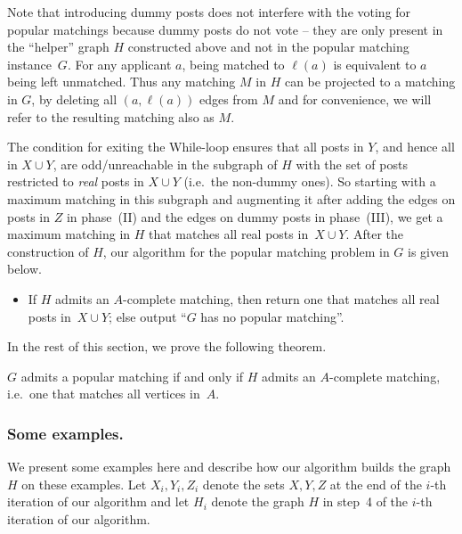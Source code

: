 \documentclass[11pt]{llncs}
\begin{document}
Note that
introducing dummy posts does not interfere with the voting for popular matchings because 
dummy posts do not vote -- they are only present in the 
``helper'' graph $H$ constructed above and not in the popular matching instance~$G$. For any
applicant $a$, being matched to $\ell(a)$ is equivalent to $a$ being left unmatched. Thus any 
matching $M$ in $H$ can be projected to a matching in $G$, by deleting all $(a,\ell(a))$ 
edges from $M$ and for convenience, we will refer to the resulting matching also as $M$.


The condition for exiting the While-loop ensures that all posts in $Y$, and hence 
all in $X \cup Y$, are odd/unreachable in the subgraph of $H$ with the set of posts 
restricted to {\em real} posts in $X \cup Y$ (i.e.\ the non-dummy ones). So starting 
with a maximum matching in this subgraph and augmenting it after adding the edges on 
posts in $Z$ in phase~(II) and the edges on dummy posts in phase~(III), we get a maximum matching 
in $H$ that matches all real posts in~$X \cup Y$. After the construction of $H$, our 
algorithm for the popular matching problem in $G$ is given below.
\begin{itemize}
\item If $H$ admits an $A$-complete matching, then return one that matches all real posts 
in~$X \cup Y$; else output ``$G$ has no popular matching''.
\end{itemize}


In the rest of this section, we prove the following theorem.

\begin{theorem} 
\label{thm:correctness}
$G$ admits a popular matching if and only if $H$ admits an $A$-complete matching, i.e.\ one 
that matches all vertices in~$A$.
\end{theorem}


\subsubsection{Some examples.}

We present some examples here and describe how our algorithm builds the graph $H$ on these examples. 
Let $X_i,Y_i,Z_i$ denote the sets 
$X,Y,Z$ at the end of the $i$-th iteration of our algorithm and let $H_i$ denote
the graph $H$ in step~4 of the $i$-th iteration of our algorithm.
\end{document}
